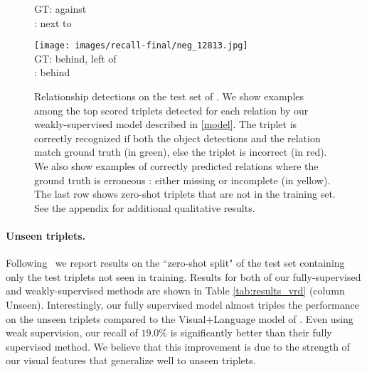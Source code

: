 \documentclass[10pt,twocolumn,letterpaper]{article}
\newcommand{\spaceparagraph}{\vspace{-.35cm}}
\begin{document}
\begin{figure*}[t]
\begin{minipage}[b]{0.18\textwidth}
    		\vspace{0.2ex}
    		\small{
       	GT: against\\
       	\cite{Lu16}: next to
       	}
       	\vspace{0.3ex}
    \end{minipage}
    \hspace{0.005\textwidth}
    \begin{minipage}[b]{0.18\textwidth}
    	\centering
       	\texttt{[image: images/recall-final/neg\_12813.jpg]}\\
       	\vspace{0.2ex}
       	\small{
       	GT: behind, left of\\
       	\cite{Lu16}: behind
       	}
       	\vspace{0.3ex}
    \end{minipage}   
     
    \setlength\abovecaptionskip{5pt}
    \caption{Relationship detections on the test set of \cite{Lu16}. We show examples among the top scored triplets detected for each relation by our weakly-supervised model described in \ref{model}. The triplet is correctly recognized if both the object detections and the relation match ground truth (in green), else the triplet is incorrect (in red). We also show examples of correctly predicted relations where the ground truth is erroneous : either missing or incomplete (in yellow). The last row shows zero-shot triplets that are not in the training set. See the appendix for additional qualitative results.}
    \vspace{-.4cm}
    \label{fig:relationship_detection_all}
\end{figure*}



\spaceparagraph
\paragraph{Unseen triplets.} Following~\cite{Lu16} we report results on the ``zero-shot split" of the test set containing only the test triplets not seen in training. Results for both of our fully-supervised and weakly-supervised methods are shown in Table \ref{tab:results_vrd} (column Unseen). Interestingly, our fully supervised model almost triples the performance on the unseen triplets compared to the Visual+Language model of \cite{Lu16}. Even using weak supervision, our recall of $19.0\%$ is significantly better than their fully supervised method. We believe that this improvement is due to the strength of our visual features that generalize well to unseen triplets. 
\end{document}
